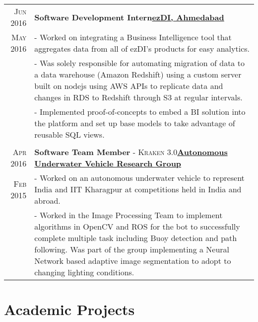 \documentclass[a4paper,10pt]{extarticle} %
\begin{document}
\begin{tabular}{r|p{17.5cm}}

\textsc{Jun 2016} & \textbf{Software Development Intern}\hfill\textbf{\href{http://www.ezdi.com/}{ezDI, Ahmedabad}}\\
\textsc{May 2016}& \footnotesize{- Worked on integrating a Business Intelligence tool that aggregates data from all of ezDI's products for easy analytics.}\\
& \footnotesize{- Was solely responsible for automating migration of data to a data warehouse (Amazon Redshift) using a custom server built on nodejs using AWS APIs to replicate data and changes in RDS to Redshift through S3 at regular intervals.}\\
& \footnotesize{- Implemented proof-of-concepts to embed a BI solution into the platform and set up base models to take advantage of reusable SQL views.}\\
\multicolumn{2}{c}{} \\

\textsc{Apr 2016} & \textbf{Software Team Member} \textsc{- Kraken 3.0}\hfill\textbf{\href{http://auv-iitkgp.in/}{Autonomous Underwater Vehicle Research Group}}\\
\textsc{Feb 2015} & \footnotesize{- Worked on an autonomous underwater vehicle to represent India and IIT Kharagpur at competitions held in India and abroad.}\\
& \footnotesize{- Worked in the Image Processing Team to implement algorithms in OpenCV and ROS for the bot to successfully complete multiple task including Buoy detection and path following. Was part of the group implementing a Neural Network based adaptive image segmentation to adopt to changing lighting conditions.}
\end{tabular}



\section{Academic Projects}
\end{document}
